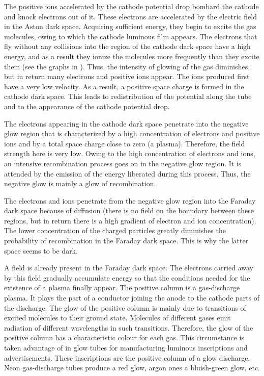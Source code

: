 The positive ions accelerated by the cathode potential drop bombard the cathode and knock electrons out of it.
These electrons are accelerated by the electric field in the Aston dark space.
Acquiring sufficient energy, they begin to excite the gas molecules, owing to which the cathode luminous film appears.
The electrons that fly without any collisions into the region of the cathode dark space have a high energy, and as a result they ionize the molecules more frequently than they excite them (see the graphs in ).
Thus, the intensity of glowing of the gas diminishes, but in return many electrons and positive ions appear.
The ions produced first have a very low velocity.
As a result, a positive space charge is formed in the cathode dark space.
This leads to redistribution of the potential along the tube and to the appearance of the cathode potential drop.

The electrons appearing in the cathode dark space penetrate into the negative glow region that is characterized by a high concentration of electrons and positive ions and by a total space charge close
to zero (a plasma).
Therefore, the field strength here is very low.
Owing to the high concentration of electrons and ions, an intensive recombination process goes on in the negative glow region.
It is attended by the emission of the energy liberated during this process. Thus,
the negative glow is mainly a glow of recombination.

The electrons and ions penetrate from the negative glow region into the Faraday dark space because of diffusion (there is no field on the boundary between these regions, but in return there is a high gradient of electron and ion concentration).
The lower concentration of the charged particles greatly diminishes the probability of recombination in the Faraday dark space.
This is why the latter space seems to be dark.

A field is already present in the Faraday dark space.
The electrons carried away by this field gradually accumulate energy so that the conditions needed for the existence of a plasma finally appear.
The positive column is a gas-discharge plasma.
It plays the part of a conductor joining the anode to the cathode parts of the discharge.
The glow of the positive column is mainly due to transitions of excited molecules to their ground state.
Molecules of different gases emit radiation of different wavelengths in such transitions.
Therefore, the glow of the positive column has a characteristic colour for each gas.
This circumstance is taken advantage of in glow tubes for manufacturing luminous inscriptions and advertisements.
These inscriptions are the positive column of a glow discharge.
Neon gas-discharge tubes produce a red glow, argon ones a bluish-green glow, etc.

